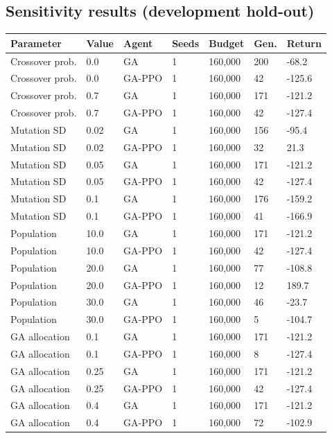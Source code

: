 \documentclass[11pt,a4paper]{article}
\begin{document}
\subsection*{Sensitivity results (development hold-out)}
\begingroup\small
\begin{longtable}{p{}p{}p{}p{}p{}p{}p{}}
\toprule
Parameter & Value & Agent & Seeds & Budget & Gen. & Return \\
\midrule\endhead
Crossover prob. & 0.0 & GA & 1 & 160,000 & 200 & -68.2 \\
Crossover prob. & 0.0 & GA-PPO & 1 & 160,000 & 42 & -125.6 \\
Crossover prob. & 0.7 & GA & 1 & 160,000 & 171 & -121.2 \\
Crossover prob. & 0.7 & GA-PPO & 1 & 160,000 & 42 & -127.4 \\
Mutation SD & 0.02 & GA & 1 & 160,000 & 156 & -95.4 \\
Mutation SD & 0.02 & GA-PPO & 1 & 160,000 & 32 & 21.3 \\
Mutation SD & 0.05 & GA & 1 & 160,000 & 171 & -121.2 \\
Mutation SD & 0.05 & GA-PPO & 1 & 160,000 & 42 & -127.4 \\
Mutation SD & 0.1 & GA & 1 & 160,000 & 176 & -159.2 \\
Mutation SD & 0.1 & GA-PPO & 1 & 160,000 & 41 & -166.9 \\
Population & 10.0 & GA & 1 & 160,000 & 171 & -121.2 \\
Population & 10.0 & GA-PPO & 1 & 160,000 & 42 & -127.4 \\
Population & 20.0 & GA & 1 & 160,000 & 77 & -108.8 \\
Population & 20.0 & GA-PPO & 1 & 160,000 & 12 & 189.7 \\
Population & 30.0 & GA & 1 & 160,000 & 46 & -23.7 \\
Population & 30.0 & GA-PPO & 1 & 160,000 & 5 & -104.7 \\
GA allocation & 0.1 & GA & 1 & 160,000 & 171 & -121.2 \\
GA allocation & 0.1 & GA-PPO & 1 & 160,000 & 8 & -127.4 \\
GA allocation & 0.25 & GA & 1 & 160,000 & 171 & -121.2 \\
GA allocation & 0.25 & GA-PPO & 1 & 160,000 & 42 & -127.4 \\
GA allocation & 0.4 & GA & 1 & 160,000 & 171 & -121.2 \\
GA allocation & 0.4 & GA-PPO & 1 & 160,000 & 72 & -102.9 \\
\bottomrule\end{longtable}
\end{document}
